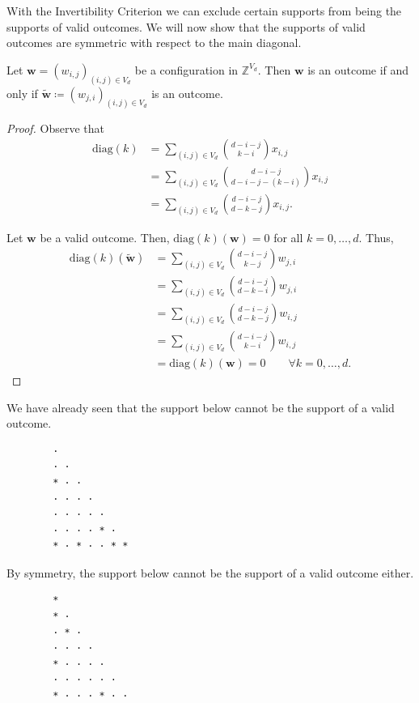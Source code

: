 With the Invertibility Criterion we can exclude certain supports from being the supports of valid outcomes. We will now show that the supports of valid outcomes are symmetric with respect to the main diagonal.

\begin{proposition}\label{prop:symmetry}
    Let \( \mathbf{w} = (w_{i,j})_{(i,j) \in V_d} \) be a configuration in \( \mathbb{Z}^{V_d} \). Then \( \mathbf{w} \) is an outcome if and only if \(  \tilde{\mathbf{w}} \coloneqq (w_{j,i})_{(i,j) \in V_d} \) is an outcome.
\end{proposition}

\begin{proof}
    Observe that
    \begin{align*}
        \mathrm{diag}(k)  &= \sum_{(i,j) \in V_d}\binom{d - i - j}{k-i} x_{i,j}\\ 
        &= \sum_{(i,j) \in V_d}\binom{d - i - j}{d-i-j-(k-i)} x_{i,j}\\
        &= \sum_{(i,j) \in V_d}\binom{d - i - j}{d-k-j} x_{i,j}.
    \end{align*}

    Let \( \mathbf{w} \) be a valid outcome. Then, \( \mathrm{diag}(k)(\mathbf{w}) = 0 \) for all \( k = 0, \dots, d \). Thus, 
    \begin{align*}
        \mathrm{diag}(k)(\tilde{\mathbf{w}}) &= \sum_{(i,j) \in V_d}\binom{d - i - j}{k-j} w_{j,i} \\
        &= \sum_{(i,j) \in V_d}\binom{d - i - j}{d-k-i} w_{j,i}\\
        &= \sum_{(i,j) \in V_d}\binom{d - i - j}{d-k-j} w_{i,j} \\
        &= \sum_{(i,j) \in V_d}\binom{d - i - j}{k-i} w_{i,j} \\
        &= \mathrm{diag}(k)(\mathbf w) = 0 \qquad \forall k = 0, \dots, d.
    \end{align*}
\end{proof}

\begin{example}
    We have already seen that the support below cannot be the support of a valid outcome.
    \begin{verbatim}
        · 
        · · 
        * · · 
        · · · · 
        · · · · · 
        · · · · * · 
        * · * · · * *
    \end{verbatim}
    By symmetry, the support below cannot be the support of a valid outcome either.
    \begin{verbatim}
        * 
        * · 
        · * · 
        · · · · 
        * · · · · 
        · · · · · · 
        * · · · * · ·
    \end{verbatim}
\end{example}

